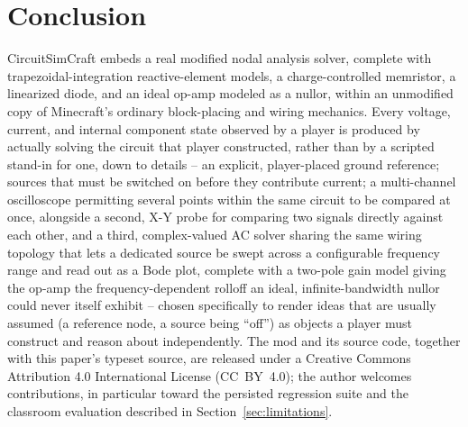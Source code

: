 \section{Conclusion}
\label{sec:conclusion}

CircuitSimCraft embeds a real modified nodal analysis solver, complete with
trapezoidal-integration reactive-element models, a charge-controlled memristor, a linearized
diode, and an ideal op-amp modeled as a nullor, within an unmodified copy of Minecraft's
ordinary block-placing and wiring mechanics. Every voltage, current, and internal component
state observed by a player is produced by actually solving the circuit that player
constructed, rather than by a scripted stand-in for one, down to details -- an explicit,
player-placed ground reference; sources that must be switched on before they contribute
current; a multi-channel oscilloscope permitting several points within the same circuit to
be compared at once, alongside a second, X-Y probe for comparing two signals directly against
each other, and a third, complex-valued AC solver sharing the same wiring topology that lets a
dedicated source be swept across a configurable frequency range and read out as a Bode plot,
complete with a two-pole gain model giving the op-amp the frequency-dependent rolloff an
ideal, infinite-bandwidth nullor could never itself exhibit -- chosen specifically to render ideas that are usually assumed (a reference node,
a source being ``off'') as objects a player must construct and reason about independently. The mod and its source code, together with this
paper's typeset source, are released under a Creative Commons Attribution 4.0 International
License (CC~BY~4.0); the author welcomes
contributions, in particular toward the persisted regression suite and the classroom
evaluation described in Section~\ref{sec:limitations}.
